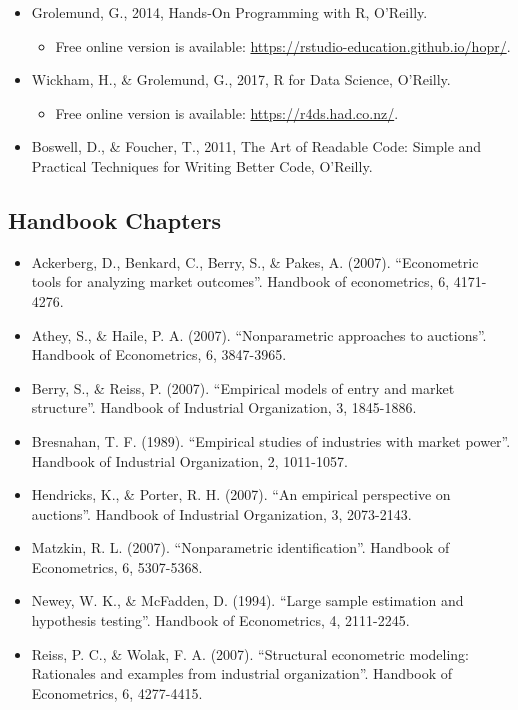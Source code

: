 \documentclass[
]{book}
\providecommand{\tightlist}{%
  \setlength{\itemsep}{0pt}\setlength{\parskip}{0pt}}
\begin{document}
\begin{itemize}
\tightlist
\item
  Grolemund, G., 2014, Hands-On Programming with R, O'Reilly.

  \begin{itemize}
  \tightlist
  \item
    Free online version is available: \url{https://rstudio-education.github.io/hopr/}.
  \end{itemize}
\item
  Wickham, H., \& Grolemund, G., 2017, R for Data Science, O'Reilly.

  \begin{itemize}
  \tightlist
  \item
    Free online version is available: \url{https://r4ds.had.co.nz/}.
  \end{itemize}
\item
  Boswell, D., \& Foucher, T., 2011, The Art of Readable Code: Simple and Practical Techniques for Writing Better Code, O'Reilly.
\end{itemize}

\hypertarget{handbook-chapters}{%
\subsection{Handbook Chapters}\label{handbook-chapters}}

\begin{itemize}
\tightlist
\item
  Ackerberg, D., Benkard, C., Berry, S., \& Pakes, A. (2007). ``Econometric tools for analyzing market outcomes''. Handbook of econometrics, 6, 4171-4276.
\item
  Athey, S., \& Haile, P. A. (2007). ``Nonparametric approaches to auctions''. Handbook of
  Econometrics, 6, 3847-3965.
\item
  Berry, S., \& Reiss, P. (2007). ``Empirical models of entry and market structure''. Handbook of Industrial Organization, 3, 1845-1886.
\item
  Bresnahan, T. F. (1989). ``Empirical studies of industries with market power''. Handbook of
  Industrial Organization, 2, 1011-1057.
\item
  Hendricks, K., \& Porter, R. H. (2007). ``An empirical perspective on auctions''. Handbook of
  Industrial Organization, 3, 2073-2143.
\item
  Matzkin, R. L. (2007). ``Nonparametric identification''. Handbook of Econometrics, 6, 5307-5368.
\item
  Newey, W. K., \& McFadden, D. (1994). ``Large sample estimation and hypothesis testing''. Handbook of Econometrics, 4, 2111-2245.
\item
  Reiss, P. C., \& Wolak, F. A. (2007). ``Structural econometric modeling: Rationales and examples from industrial organization''. Handbook of Econometrics, 6, 4277-4415.
\end{itemize}
\end{document}
